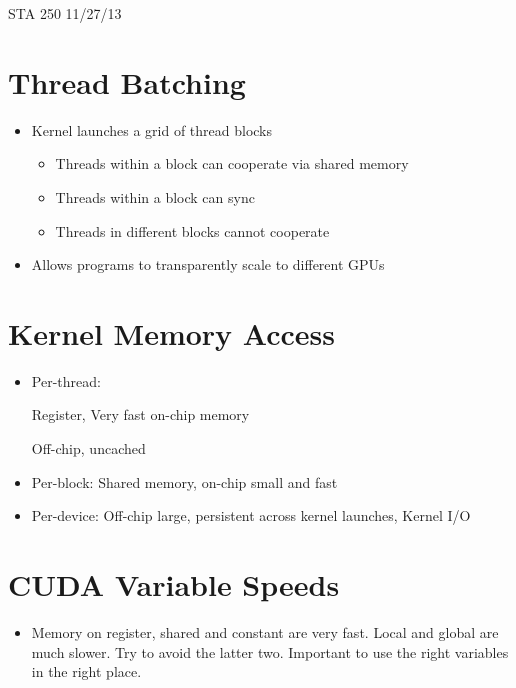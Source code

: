 \documentclass[]{article}
\begin{document}
STA 250 \hfill 11/27/13

\section*{Thread Batching}
\begin{itemize}
\item
Kernel launches a grid of thread blocks
\begin{itemize}
\item
Threads within a block can cooperate via shared memory
\item
Threads within a block can sync
\item
Threads in different blocks cannot cooperate
\end{itemize}
\item
Allows programs to transparently scale to different GPUs
\end{itemize}

\section*{Kernel Memory Access}
\begin{itemize}
\item
Per-thread:

Register, Very fast on-chip memory

Off-chip, uncached
\item
Per-block:
Shared memory, on-chip small and fast

\item
Per-device:
Off-chip large, persistent across kernel launches, Kernel I/O
\end{itemize}

\section*{CUDA Variable Speeds}
\begin{itemize}
\item
Memory on register, shared and constant are very fast.  Local and global are much slower.  Try to avoid the latter two.  Important to use the right variables in the right place.
\end{itemize}
\end{document}
